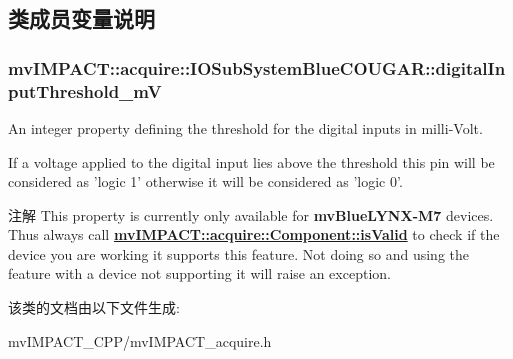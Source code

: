 \subsection{类成员变量说明}
\hypertarget{classmv_i_m_p_a_c_t_1_1acquire_1_1_i_o_sub_system_blue_c_o_u_g_a_r_ac88f543939c57dd490abbeda9dab2a9c}{
\subsubsection[{digital\+Input\+Threshold\+\_\+m\+V}]{ mv\+I\+M\+P\+A\+C\+T\+::acquire\+::\+I\+O\+Sub\+System\+Blue\+C\+O\+U\+G\+A\+R\+::digital\+Input\+Threshold\+\_\+m\+V}}\label{classmv_i_m_p_a_c_t_1_1acquire_1_1_i_o_sub_system_blue_c_o_u_g_a_r_ac88f543939c57dd490abbeda9dab2a9c}


An integer property defining the threshold for the digital inputs in milli-\/\+Volt. 

If a voltage applied to the digital input lies above the threshold this pin will be considered as 'logic 1' otherwise it will be considered as 'logic 0'.

\begin{DoxyNote}{注解}
This property is currently only available for {\bfseries mv\+Blue\+L\+Y\+N\+X-\/\+M7} devices. Thus always call {\bfseries \hyperlink{classmv_i_m_p_a_c_t_1_1acquire_1_1_component_ac51e55e7e046101f3c6119d84123abd5}{mv\+I\+M\+P\+A\+C\+T\+::acquire\+::\+Component\+::is\+Valid}} to check if the device you are working it supports this feature. Not doing so and using the feature with a device not supporting it will raise an exception. 
\end{DoxyNote}


该类的文档由以下文件生成\+:\begin{DoxyCompactItemize}
\item 
mv\+I\+M\+P\+A\+C\+T\+\_\+\+C\+P\+P/mv\+I\+M\+P\+A\+C\+T\+\_\+acquire.\+h\end{DoxyCompactItemize}
